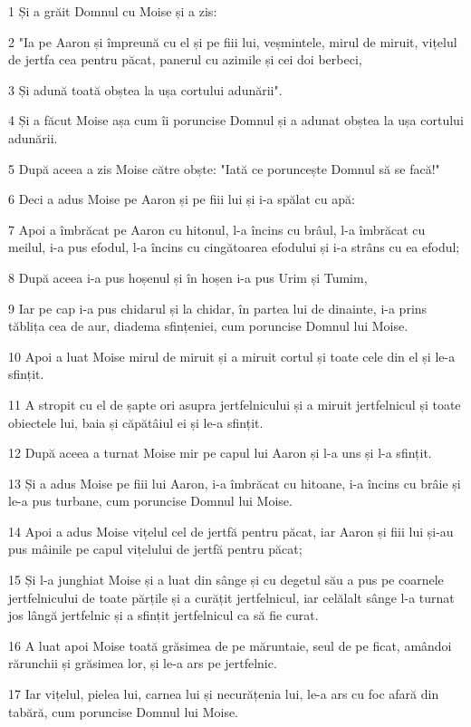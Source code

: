 \par 1 Și a grăit Domnul cu Moise și a zis:
\par 2 "Ia pe Aaron și împreună cu el și pe fiii lui, veșmintele, mirul de miruit, vițelul de jertfa cea pentru păcat, panerul cu azimile și cei doi berbeci,
\par 3 Și adună toată obștea la ușa cortului adunării".
\par 4 Și a făcut Moise așa cum îi poruncise Domnul și a adunat obștea la ușa cortului adunării.
\par 5 După aceea a zis Moise către obște: "Iată ce poruncește Domnul să se facă!"
\par 6 Deci a adus Moise pe Aaron și pe fiii lui și i-a spălat cu apă:
\par 7 Apoi a îmbrăcat pe Aaron cu hitonul, l-a încins cu brâul, l-a îmbrăcat cu meilul, i-a pus efodul, l-a încins cu cingătoarea efodului și i-a strâns cu ea efodul;
\par 8 După aceea i-a pus hoșenul și în hoșen i-a pus Urim și Tumim,
\par 9 Iar pe cap i-a pus chidarul și la chidar, în partea lui de dinainte, i-a prins tăblița cea de aur, diadema sfințeniei, cum poruncise Domnul lui Moise.
\par 10 Apoi a luat Moise mirul de miruit și a miruit cortul și toate cele din el și le-a sfințit.
\par 11 A stropit cu el de șapte ori asupra jertfelnicului și a miruit jertfelnicul și toate obiectele lui, baia și căpătâiul ei și le-a sfințit.
\par 12 După aceea a turnat Moise mir pe capul lui Aaron și l-a uns și l-a sfințit.
\par 13 Și a adus Moise pe fiii lui Aaron, i-a îmbrăcat cu hitoane, i-a încins cu brâie și le-a pus turbane, cum poruncise Domnul lui Moise.
\par 14 Apoi a adus Moise vițelul cel de jertfă pentru păcat, iar Aaron și fiii lui și-au pus mâinile pe capul vițelului de jertfă pentru păcat;
\par 15 Și l-a junghiat Moise și a luat din sânge și cu degetul său a pus pe coarnele jertfelnicului de toate părțile și a curățit jertfelnicul, iar celălalt sânge l-a turnat jos lângă jertfelnic și a sfințit jertfelnicul ca să fie curat.
\par 16 A luat apoi Moise toată grăsimea de pe măruntaie, seul de pe ficat, amândoi rărunchii și grăsimea lor, și le-a ars pe jertfelnic.
\par 17 Iar vițelul, pielea lui, carnea lui și necurățenia lui, le-a ars cu foc afară din tabără, cum poruncise Domnul lui Moise.
